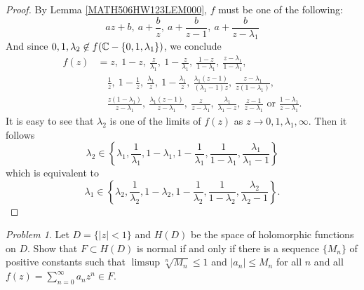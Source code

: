 \documentclass[11pt]{amsart}
\theoremstyle{remark}
\newtheorem{prob}{Problem}[section]
\theoremstyle{definition}
\numberwithin{equation}{section}
\begin{document}
\begin{proof}
    By Lemma \ref{MATH506HW123LEM000}, $f$ must be one of the following:
    \[
        az +b,\ a + \frac{b}z,\ a+ \frac{b}{z-1},\ a+\frac{b}{z-\lambda_1}
    \]
    And since $0,1,\lambda_2\not\in f({\mathbb C} - \{0,1,\lambda_1\})$, we conclude
    \[
        \begin{aligned}
            f(z) & = z,\ 1-z,\ \frac{z}{\lambda_1},\ 1-\frac{z}{\lambda_1},\ \frac{1-z}{1-\lambda_1},\ \frac{z-\lambda_1}{1- \lambda_1},                                                \\
                 & \quad \frac{1}{z},\ 1 - \frac{1}{z},\ \frac{\lambda_1}{z}, \ 1 - \frac{\lambda_1}{z},\ \frac{\lambda_1(z-1)}{(\lambda_1 - 1)z},\ \frac{z-\lambda_1}{z(1-\lambda_1)},
            \\
                 & \quad\frac{z(1-\lambda_1)}{z-\lambda_1},\ \frac{\lambda_1(z-1)}{z-\lambda_1},\ \frac{z}{z-\lambda_1},\
            \frac{\lambda_1}{\lambda_1 - z},\ \frac{z-1}{z-\lambda_1} \text{ or } \frac{1-\lambda_1}{z - \lambda_1}.
        \end{aligned}
    \]
    It is easy to see that $\lambda_2$ is one of the limits of $f(z)$ as $z\to 0,1,\lambda_1,\infty$. Then it follows
    \[
        \lambda_2 \in \left\{
        \lambda_1, \frac{1}{\lambda_1}, 1 - \lambda_1, 1 - \frac{1}{\lambda_1}, \frac{1}{1-\lambda_1}, \frac{\lambda_1}{\lambda_1 - 1}
        \right\}
    \]
    which is equivalent to
    \[
        \lambda_1 \in \left\{
        \lambda_2, \frac{1}{\lambda_2}, 1 - \lambda_2, 1 - \frac{1}{\lambda_2}, \frac{1}{1-\lambda_2}, \frac{\lambda_2}{\lambda_2 - 1}
        \right\}.
    \]
\end{proof}

\begin{prob}
    Let $D = \{|z| < 1\}$ and $H(D)$ be the space of holomorphic functions on $D$. Show that $F\subset H(D)$ is normal if and only if there is a sequence $\{M_n\}$ of positive constants such that
    $\limsup \sqrt[n]{M_n} \le 1$ and $|a_n|\le M_n$ for all $n$ and
    all $f(z) = \sum_{n=0}^\infty a_n z^n \in F$.
\end{prob}
\end{document}
